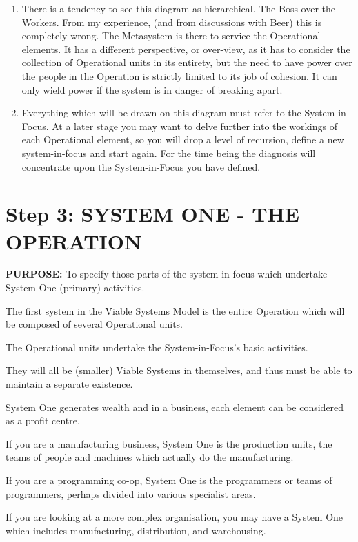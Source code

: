\begin{enumerate}
  \item There is a tendency to see this diagram as hierarchical. The Boss over the Workers. From my experience, (and from discussions with Beer) this is completely wrong. The Metasystem is there to service the Operational elements. It has a different perspective, or over-view, as it has to consider the collection of Operational units in its entirety, but the need to have power over the people in the Operation is strictly limited to its job of cohesion. It can only wield power if the system is in danger of breaking apart.

  \item Everything which will be drawn on this diagram must refer to the System-in-Focus. At a later stage you may want to delve further into the workings of each Operational element, so you will drop a level of recursion, define a new system-in-focus and start again. For the time being the diagnosis will concentrate upon the System-in-Focus you have defined.

\end{enumerate}

\section*{Step 3: SYSTEM ONE - THE OPERATION}
\textbf{PURPOSE:} To specify those parts of the system-in-focus which undertake System One (primary) activities.

The first system in the Viable Systems Model is the entire Operation which will be composed of several Operational units.

The Operational units undertake the System-in-Focus's basic activities.

They will all be (smaller) Viable Systems in themselves, and thus must be able to maintain a separate existence.

System One generates wealth and in a business, each element can be considered as a profit centre.

If you are a manufacturing business, System One is the production units, the teams of people and machines which actually do the manufacturing.

If you are a programming co-op, System One is the programmers or teams of programmers, perhaps divided into various specialist areas.

If you are looking at a more complex organisation, you may have a System One which includes manufacturing, distribution, and warehousing.

